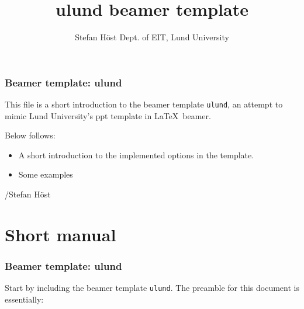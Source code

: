 \documentclass[aspectratio=1610]{beamer}
\title[ulund beamer]{ulund beamer template}
\author[S. Höst]{%
  Stefan Höst\newline
  Dept. of EIT, Lund University}
\begin{document}
\begin{frame}[plain]%
  \titlepage
\end{frame}

\begin{frame}
  \frametitle{Beamer template: ulund}
  This file is a short introduction to the beamer template \texttt{ulund}, an attempt to mimic Lund University's ppt template in \LaTeX\ beamer.

  
Below follows:
\begin{itemize}
\item A short introduction to the implemented options in the template. 
\item Some examples
\end{itemize}

/Stefan Höst
\end{frame}


\section{Short manual}

\begin{frame}[fragile]
  \frametitle{Beamer template: ulund}
  Start by including the beamer template \texttt{ulund}. The preamble for this document is essentially: 
\end{frame}
\end{document}
